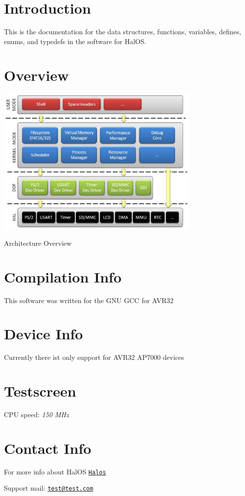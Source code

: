 \hypertarget{index_intro}{}\section{Introduction}\label{index_intro}
This is the documentation for the data structures, functions, variables, defines, enums, and typedefs in the software for HalOS.\hypertarget{index_Architecture}{}\section{Overview}\label{index_Architecture}
 \begin{Image}
\begin{center}
\includegraphics[width=10cm]{overview}\caption{Architecture Overview}
\end{center}
\end{Image}
\hypertarget{index_compinfo}{}\section{Compilation Info}\label{index_compinfo}
This software was written for the GNU GCC for AVR32\hypertarget{index_deviceinfo}{}\section{Device Info}\label{index_deviceinfo}
Currently there ist only support for AVR32 AP7000 devices\hypertarget{index_Example1}{}\section{Testscreen}\label{index_Example1}
CPU speed: {\em 150 MHz\/}\hypertarget{index_contactinfo}{}\section{Contact Info}\label{index_contactinfo}
For more info about HalOS \href{http://}{\tt Halos} \par
 Support mail: \href{mailto:test@test.com}{\tt test@test.com} 